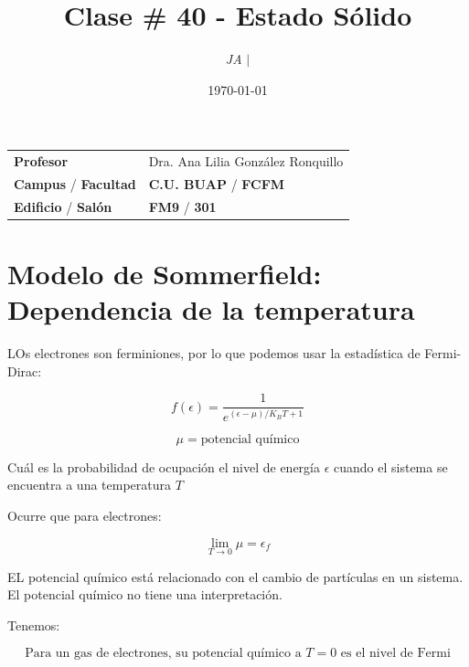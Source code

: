 \documentclass{article}
\title{Clase \# 40 - Estado Sólido}
\author{\emph{JA} $\boldsymbol{\mid}$}
\date{\today}
\begin{document}
\maketitle



\begin{mybox}
\noindent\begin{tabular}{@{}ll}
	{\bfseries{Profesor}} & Dra. Ana Lilia González Ronquillo\\
	\textcolor{prussianblue}{\bfseries{Campus}} / \textcolor{trueblue}{\bfseries{Facultad}}  & \textcolor{prussianblue}{\bfseries{C.U. BUAP}} /  \textcolor{trueblue}{\bfseries{FCFM}} \\
	\textcolor{prussianblue}{\bfseries{Edificio}} /  \textcolor{trueblue}{\bfseries{Salón}}    & 	\textcolor{prussianblue}{\bfseries{FM9}} /  \textcolor{trueblue}{\bfseries{301}}   
\end{tabular} 
\end{mybox} \vspace{1cm}

\tableofcontents

\vspace{2cm}


\section{Modelo de Sommerfield: Dependencia de la temperatura}


LOs electrones son ferminiones, por lo que podemos usar la estadística de Fermi-Dirac: 


\[ f(\epsilon) = \frac{1}{ e^{( \epsilon - \mu  )/ K_{B}T +1}      }  \]



\[ \mu = \text{potencial químico} \]


Cuál es la probabilidad de ocupación el nivel de energía $\epsilon$ cuando el sistema se encuentra a una temperatura $T$

Ocurre que para electrones:


\[ \lim\limits_{T \to 0 }  \mu = \epsilon_{f}  \]


EL potencial químico está relacionado con el cambio de partículas en un sistema. El potencial químico no tiene una interpretación. 

Tenemos:

\[  \boxed{ \text{Para un gas de electrones, su potencial químico a $T=0$ es el nivel de Fermi} }  \]
\end{document}
